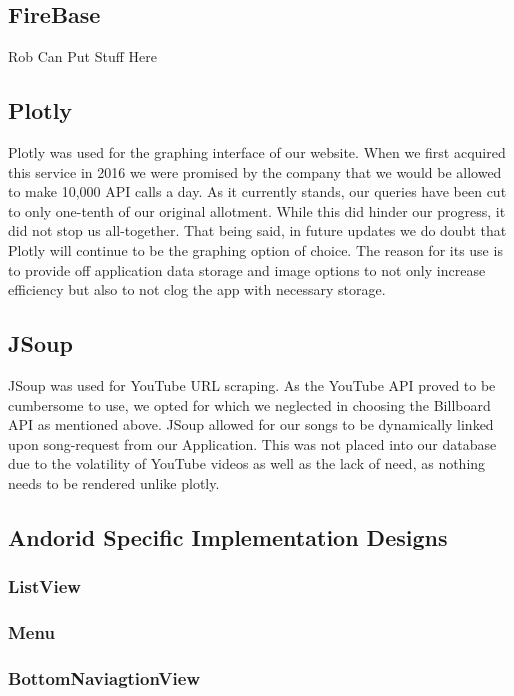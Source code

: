 \documentclass{article}
\begin{document}
\subsection*{FireBase}





Rob Can Put Stuff Here





\subsection*{Plotly}
Plotly was used for the graphing interface of our website.
When we first acquired this service in 2016 we were promised by the company that we would be allowed to make 10,000 API calls a day.
As it currently stands, our queries have been cut to only one-tenth of our original allotment. While this did hinder our progress, it did not stop us all-together. That being said, in future updates we do doubt that Plotly will continue to be the graphing option of choice.
The reason for its use is to provide off application data storage and image options to not only increase efficiency but also to not clog the app with necessary storage.
\subsection*{JSoup}
JSoup was used for YouTube URL scraping.
As the YouTube API proved to be cumbersome to use, we opted for which we neglected in choosing the Billboard API as mentioned above.
JSoup allowed for our songs to be dynamically linked upon song-request from our Application.
This was not placed into our database due to the volatility of YouTube videos as well as the lack of need, as nothing needs to be rendered unlike plotly.
\subsection*{Andorid Specific Implementation Designs}
\subsubsection*{ListView}

\subsubsection*{Menu}

\subsubsection*{BottomNaviagtionView}
\end{document}
